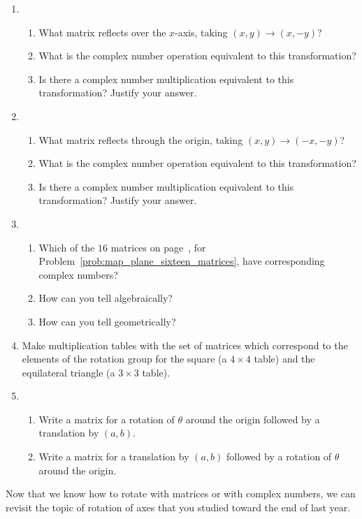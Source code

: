 \documentclass[../gatm.tex]{subfiles}
\begin{document}
\begin{enumerate}
\setcounter{enumi}{\value{problem_i}}
\item\begin{enumerate}
\item What matrix reflects over the $x$-axis, taking $(x,y)\to (x,-y)$?
\item What is the complex number operation equivalent to this transformation?
\item Is there a complex number multiplication equivalent to this transformation? Justify your answer.
\end{enumerate}
\item\begin{enumerate}
\item What matrix reflects through the origin, taking $(x,y)\to (-x,-y)$?
\item What is the complex number operation equivalent to this transformation?
\item Is there a complex number multiplication equivalent to this transformation? Justify your answer.
\end{enumerate}
\item \begin{enumerate}
\item Which of the $16$ matrices on page~\pageref{prob:map_plane_sixteen_matrices}, for Problem~\ref{prob:map_plane_sixteen_matrices}, have corresponding complex numbers?
\item How can you tell algebraically?
\item How can you tell geometrically?
\end{enumerate}
\item Make multiplication tables with the set of matrices which correspond to the elements of the rotation group for the square (a $4\times 4$ table) and the equilateral triangle (a $3\times 3$ table).
\item \begin{enumerate}
\item Write a matrix for a rotation of $\theta$ around the origin followed by a translation by $(a,b)$.
\item Write a matrix for a translation by $(a,b)$ followed by a rotation of $\theta$ around the origin.
\end{enumerate}
\setcounter{problem_i}{\value{enumi}}
\end{enumerate}

\noindent Now that we know how to rotate with matrices or with complex numbers, we can revisit the topic of rotation of axes that you studied toward the end of last year.
\end{document}
